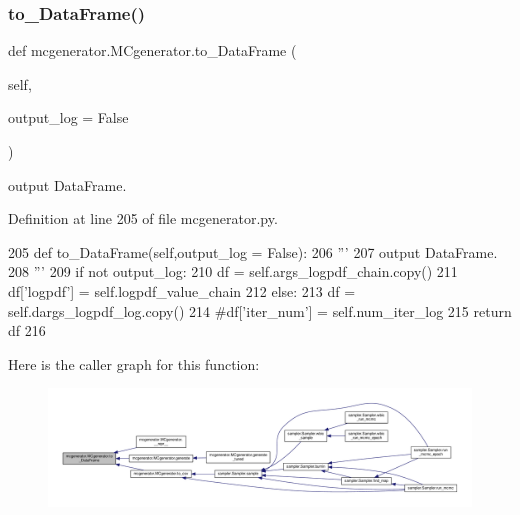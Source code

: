 \subsubsection{\texorpdfstring{to\+\_\+\+Data\+Frame()}{to\_DataFrame()}}
{\footnotesize\ttfamily def mcgenerator.\+M\+Cgenerator.\+to\+\_\+\+Data\+Frame (\begin{DoxyParamCaption}\item[{}]{self,  }\item[{}]{output\+\_\+log = {\ttfamily False} }\end{DoxyParamCaption})}

\begin{DoxyVerb}output DataFrame.
\end{DoxyVerb}
 

Definition at line 205 of file mcgenerator.\+py.


\begin{DoxyCode}
205     \textcolor{keyword}{def }to\_DataFrame(self,output\_log = False):
206         \textcolor{stringliteral}{'''}
207 \textcolor{stringliteral}{        output DataFrame.}
208 \textcolor{stringliteral}{        '''}
209         \textcolor{keywordflow}{if} \textcolor{keywordflow}{not} output\_log:
210             df = self.args\_logpdf\_chain.copy()
211             df[\textcolor{stringliteral}{'logpdf'}] = self.logpdf\_value\_chain
212         \textcolor{keywordflow}{else}:
213             df = self.dargs\_logpdf\_log.copy()
214             \textcolor{comment}{#df['iter\_num'] = self.num\_iter\_log}
215         \textcolor{keywordflow}{return} df
216 
\end{DoxyCode}
Here is the caller graph for this function\+:\nopagebreak
\begin{figure}[H]
\begin{center}
\leavevmode
\includegraphics[width=350pt]{d3/dad/classmcgenerator_1_1MCgenerator_ac5245cc93c2aa162abe1757ffdf60699_icgraph}
\end{center}
\end{figure}
\mbox{\label{classmcgenerator_1_1MCgenerator_ac92600d8782d14be52db33b1259b10b1}} 
